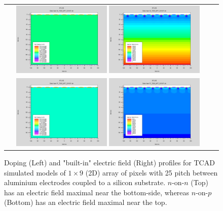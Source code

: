 \begin{figure}[!h]
  \begin{center}
    \begin{tabular}{cc}
      \includegraphics[width=0.45\textwidth]{fig_FastTiming/Net_Doping_nonn.png}
      \includegraphics[width=0.45\textwidth]{fig_FastTiming/ElectricField_nonn.png} \\
      \includegraphics[width=0.45\textwidth]{fig_FastTiming/Net_Doping_nonp.png}
      \includegraphics[width=0.45\textwidth]{fig_FastTiming/ElectricField_nonp.png} \\
    \end{tabular}
    \caption{Doping (Left) and "built-in" electric field (Right) profiles for TCAD simulated models of $1 \times 9$ (2D) array of pixels with 25 \si{\micron} pitch between aluminium electrodes coupled to a silicon substrate.
            $n$-on-$n$ (Top) has an electric field maximal near the bottom-side, whereas $n$-on-$p$ (Bottom) has an electric field maximal near the top.
            }
    \label{Doping_ElectricField}
  \end{center}
\end{figure}

